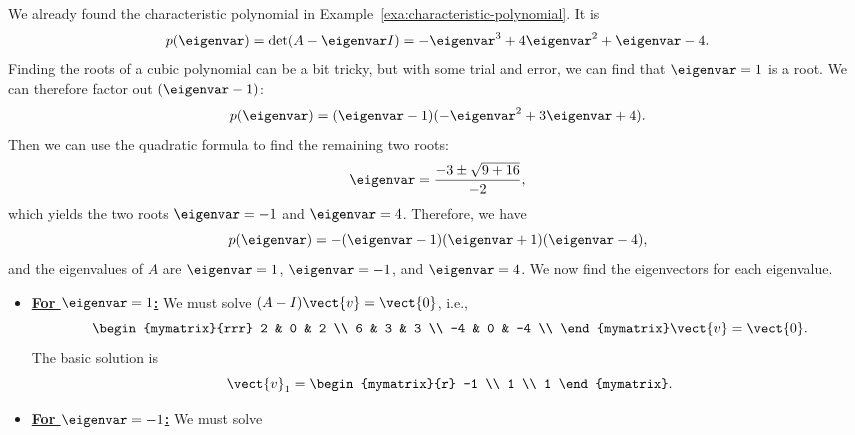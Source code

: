 \begin{solution}
  We already found the characteristic polynomial in
  Example~\ref{exa:characteristic-polynomial}. It is
  \begin{equation*}
    p(\eigenvar)
    = \det(A-\eigenvar I)
    = -\eigenvar^3 + 4\eigenvar^2 + \eigenvar - 4.
  \end{equation*}
  Finding the roots%
  of a cubic polynomial can be a bit tricky, but
  with some trial and error, we can find that $\eigenvar=1$ is a
  root. We can therefore factor out $(\eigenvar-1)$:
  \begin{equation*}
    p(\eigenvar) = (\eigenvar-1)(-\eigenvar^2+3\eigenvar+4).
  \end{equation*}
  Then we can use the quadratic formula to find the remaining two
  roots:
  \begin{equation*}
    \eigenvar = \frac{-3\pm\sqrt{9+16}}{-2},
  \end{equation*}
  which yields the two roots $\eigenvar=-1$ and $\eigenvar=4$. Therefore,
  we have
  \begin{equation*}
    p(\eigenvar) = -(\eigenvar-1)(\eigenvar+1)(\eigenvar-4),
  \end{equation*}
  and the eigenvalues of $A$ are $\eigenvar=1$, $\eigenvar=-1$, and
  $\eigenvar=4$. We now find the eigenvectors for each eigenvalue.
  \begin{itemize}
  \item {\bf{\underline{For $\eigenvar=1$:}}} We must solve
    $(A-I)\/\vect{v}=\vect{0}$, i.e.,
    \begin{equation*}
      \begin{mymatrix}{rrr}
        2  & 0 &  2 \\
        6  & 3 &  3 \\
        -4 & 0 & -4 \\
      \end{mymatrix}\vect{v}=\vect{0}.
    \end{equation*}
    The basic solution is
    \begin{equation*}
      \vect{v}_1 = \begin{mymatrix}{r} -1 \\ 1 \\ 1 \end{mymatrix}.
    \end{equation*}
  \item {\bf{\underline{For $\eigenvar=-1$:}}} We must solve

\end{itemize}
\end{solution}
